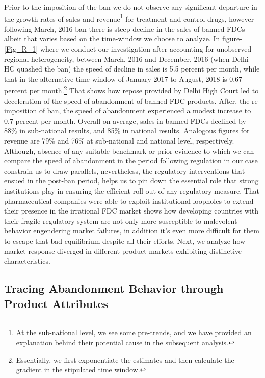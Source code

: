 \documentclass[AER]{AEA}
\theoremstyle{theorem}
\begin{document}
Prior to the imposition of the ban we do not observe any significant departure in the growth rates of sales and revenue\footnote{At the sub-national level, we see some pre-trends, and we have provided an explanation behind their potential cause in the subsequent analysis.} for treatment and control drugs, however following  March, 2016 ban there is steep decline in the sales of banned FDCs albeit that varies based on the time-window we choose to analyze. In figure-\ref{Fig_R_1} where we conduct our investigation after accounting for unobserved regional heterogeneity, between March, 2016 and December, 2016 (when Delhi HC quashed the ban) the speed of decline in sales is 5.5 percent per month, while that in the alternative time window of January-2017 to August, 2018 is 0.67 percent per month.\footnote{Essentially, we first exponentiate the estimates and then calculate the gradient in the stipulated time window.} That shows how repose provided by Delhi High Court led to deceleration of the speed of abandonment of banned FDC products. After, the re-imposition of ban, the speed of abandonment experienced a modest increase to 0.7 percent per month. Overall on average, sales in banned FDCs declined by 88\% in sub-national results, and 85\% in national results. Analogous figures for revenue are 79\% and 76\% at sub-national and national level, respectively. Although, absence of any suitable benchmark or prior evidence to which we can compare the speed of abandonment in the period following regulation in our case constrain us to draw parallels, nevertheless, the regulatory interventions that ensued in the post-ban period, helps us to pin down the essential role that strong institutions play in ensuring the efficient roll-out of any regulatory measure. That pharmaceutical companies were able to exploit institutional loopholes to extend their presence in the irrational FDC market shows how developing countries with their fragile regulatory system are not only more susceptible to malevolent behavior engendering market failures, in addition it's even more difficult for them to escape that bad equilibrium despite all their efforts. Next, we analyze how market response diverged in different product markets exhibiting distinctive characteristics.

\subsection{Tracing Abandonment Behavior through Product Attributes}
\end{document}
